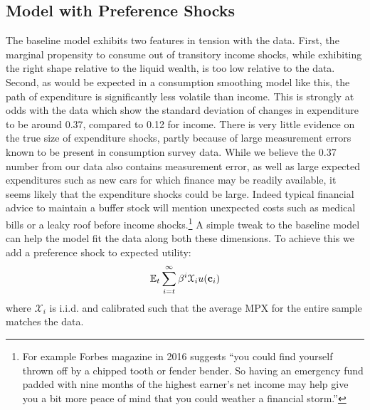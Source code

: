 \documentclass[titlepage]{\econtex}\newcommand{\texname}{ConsumptionHeterogeneity}
\begin{document}
\subsection{Model with Preference Shocks}
The baseline model exhibits two features in tension with the data. First, the marginal propensity to consume out of transitory income shocks, while exhibiting the right shape relative to the liquid wealth, is too low relative to the data. Second, as would be expected in a consumption smoothing model like this, the path of expenditure is significantly less volatile than income. This is strongly at odds with the data which show the standard deviation of changes in expenditure to be around 0.37, compared to 0.12 for income. There is very little evidence on the true size of expenditure shocks, partly because of large measurement errors known to be present in consumption survey data. While we believe the 0.37 number from our data also contains measurement error, as well as large expected expenditures such as new cars for which finance may be readily available, it seems likely that the expenditure shocks could be large. Indeed typical financial advice to maintain a buffer stock will mention unexpected costs such as medical bills or a leaky roof before income shocks.\footnote{For example Forbes magazine in 2016 suggests ``you could find yourself thrown off by a chipped tooth or fender bender. So having an emergency fund padded with nine months of the highest earner's net income may help give you a bit more peace of mind that you could weather a financial storm.''} A simple tweak to the baseline model can help the model fit the data along both these dimensions. To achieve this we add a preference shock to expected utility:
\begin{align*}
\mathbb{E}_t \sum_{i=t}^{\infty} \beta^i \mathcal{X}_i u(\mathbf{c}_i)
\end{align*}
where $\mathcal{X}_i$ is i.i.d. and calibrated such that the average MPX for the entire sample matches the data.
\end{document}
